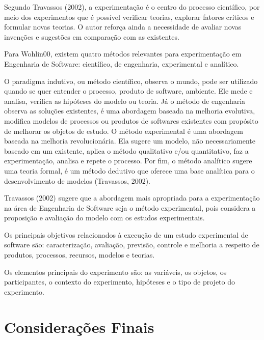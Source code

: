 Segundo Travassos (2002), a experimentação é o centro do processo científico, por meio dos experimentos que é possível verificar teorias, explorar fatores críticos e formular novas teorias. O autor reforça ainda a necessidade de avaliar novas invenções e sugestões em comparação com as existentes.

Para Wohlin00, existem quatro métodos relevantes para experimentação em Engenharia de Software: científico, de engenharia, experimental e analítico. 

O paradigma indutivo, ou método científico, observa o mundo, pode ser utilizado quando se quer entender o processo, produto de software, ambiente. Ele mede e analisa, verifica as hipóteses do modelo ou teoria.  Já o método de engenharia observa as soluções existentes, é uma abordagem baseada na melhoria evolutiva, modifica modelos de processos ou produtos de softwares existentes com propósito de melhorar os objetos de estudo. O método experimental é uma abordagem baseada na melhoria revolucionária. Ela sugere um modelo, não necessariamente baseado em um existente, aplica o método qualitativo e/ou quantitativo, faz a experimentação, analisa e repete o processo. Por fim, o método analítico sugere uma teoria formal, é um método dedutivo que oferece uma base analítica para o desenvolvimento de modelos (Travassos, 2002).

Travassos (2002) sugere que a abordagem mais apropriada para a experimentação na área de Engenharia de Software seja o método experimental, pois considera a proposição e avaliação do modelo com os estudos experimentais.

Os principais objetivos relacionados à execução de um estudo experimental de software são: caracterização, avaliação, previsão, controle e melhoria a respeito de produtos, processos, recursos, modelos e teorias.

Os elementos principais do experimento são: as variáveis, os objetos, os participantes, o contexto do experimento, hipóteses e o tipo de projeto do experimento.


\section{Considerações Finais}